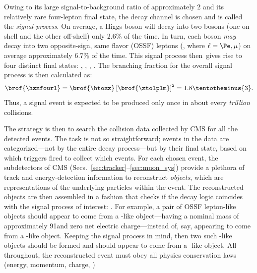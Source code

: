 
Owing to its large signal-to-background ratio of approximately 2
and its relatively rare four-lepton final state, the \hzzfourl decay channel is chosen and is called the \emph{signal process}.
On average, a Higgs boson will decay into two \PZ bosons (one on-shell and the other off-shell) only 2.6\% of the time.
In turn, each \PZ boson \emph{may} decay into two opposite-sign, same flavor (OSSF) leptons (\ztolplm, where $\ell = \Pe, \mu$) on average approximately 6.7\% of the time.
This signal process then gives rise to four distinct final states: \foure, \fourmu, \twoetwomu, \twomutwoe.
The branching fraction for the overall signal process is then calculated as: %
\begin{equation*}
    \brof{\hzzfourl} = \brof{\htozz} \left[ \brof{\ztolplm} \right]^2 = 1.8\tentotheminus{3}.
\end{equation*}
Thus, a signal event is expected to be produced only once in about every \emph{trillion} \pp collisions.

The strategy is then to search the \pp collision data collected by CMS for all the detected \hzzfourl events.
The task is not so straightforward;
events in the data are categorized---not by the entire decay process---but by their final state, based on which triggers fired to collect which events.
For each chosen event, the subdetectors of CMS (Secs.~\ref{sec:tracker}--\ref{sec:muon_sys}) provide a plethora of track and energy-detection information to reconstruct \emph{objects}, which are representations of the underlying particles within the event.
The reconstructed objects are then assembled in a fashion that checks if the decay logic coincides with the signal process of interest: \hzzfourl.
For example, a pair of OSSF lepton-like objects should appear to come from a \PZ-like object---\ie having a nominal mass of approximately 91\GeV and zero net electric charge---instead of, say, appearing to come from a \PH-like object.
Keeping the signal process in mind, then two such \PZ-like objects should be formed and should appear to come from a \PH-like object.
All throughout, the reconstructed event must obey all physics conservation laws (energy, momentum, charge, \etc)

